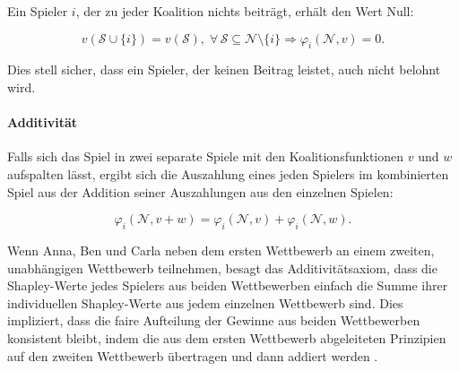 Ein Spieler $i$, der zu jeder Koalition nichts beiträgt, erhält den Wert Null:

\begin{equation}
  v(\mathcal{S} \cup \{i\}) =  v(\mathcal{S}), \; \forall\, \mathcal{S} \subseteq \mathcal{N} \setminus \{i\} \Rightarrow \varphi_i (\mathcal{N}, v) = 0.
\end{equation}

Dies stell sicher, dass ein Spieler, der keinen Beitrag leistet, auch nicht belohnt wird. 

\paragraph{\rmfamily\bfseries Additivität} 

Falls sich das Spiel in zwei separate Spiele mit den Koalitionsfunktionen $v$ und $w$ aufspalten lässt, 
ergibt sich die Auszahlung eines jeden Spielers im kombinierten Spiel aus der Addition seiner Auszahlungen aus den einzelnen Spielen:

\begin{equation}
\varphi_i (\mathcal{N}, v + w) = \varphi_i (\mathcal{N}, v) + \varphi_i (\mathcal{N}, w).
\end{equation}

Wenn Anna, Ben und Carla neben dem ersten Wettbewerb an einem zweiten, unabhängigen Wettbewerb teilnehmen, 
besagt das Additivitätsaxiom, dass die Shapley-Werte jedes Spielers aus beiden Wettbewerben einfach die Summe ihrer individuellen 
Shapley-Werte aus jedem einzelnen Wettbewerb sind. Dies impliziert, dass die faire Aufteilung der Gewinne aus beiden Wettbewerben 
konsistent bleibt, indem die aus dem ersten Wettbewerb abgeleiteten Prinzipien auf den zweiten Wettbewerb übertragen und 
dann addiert werden \cite[S. 5573, S.22f]{ijcai2022p778, Molnar_2022}.